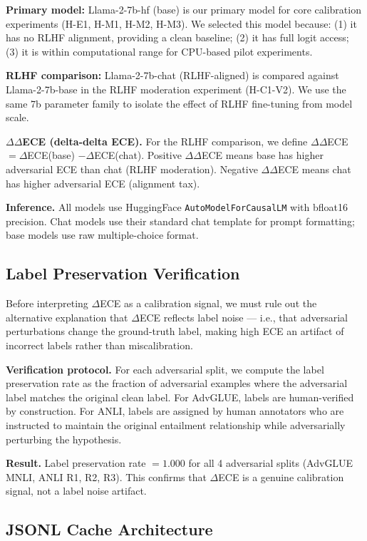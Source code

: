 \textbf{Primary model:} Llama-2-7b-hf (base) is our primary model for core calibration experiments (H-E1, H-M1, H-M2, H-M3). We selected this model because: (1) it has no RLHF alignment, providing a clean baseline; (2) it has full logit access; (3) it is within computational range for CPU-based pilot experiments.

\textbf{RLHF comparison:} Llama-2-7b-chat (RLHF-aligned) is compared against Llama-2-7b-base in the RLHF moderation experiment (H-C1-V2). We use the same 7b parameter family to isolate the effect of RLHF fine-tuning from model scale.

\textbf{$\Delta\Delta$ECE (delta-delta ECE).} For the RLHF comparison, we define $\Delta\Delta$ECE $= \Delta$ECE(base) $- \Delta$ECE(chat). Positive $\Delta\Delta$ECE means base has higher adversarial ECE than chat (RLHF moderation). Negative $\Delta\Delta$ECE means chat has higher adversarial ECE (alignment tax).

\textbf{Inference.} All models use HuggingFace \texttt{AutoModelForCausalLM} with bfloat16 precision. Chat models use their standard chat template for prompt formatting; base models use raw multiple-choice format.

\subsection{Label Preservation Verification}

Before interpreting $\Delta$ECE as a calibration signal, we must rule out the alternative explanation that $\Delta$ECE reflects label noise --- i.e., that adversarial perturbations change the ground-truth label, making high ECE an artifact of incorrect labels rather than miscalibration.

\textbf{Verification protocol.} For each adversarial split, we compute the label preservation rate as the fraction of adversarial examples where the adversarial label matches the original clean label. For AdvGLUE, labels are human-verified by construction. For ANLI, labels are assigned by human annotators who are instructed to maintain the original entailment relationship while adversarially perturbing the hypothesis.

\textbf{Result.} Label preservation rate $= 1.000$ for all 4 adversarial splits (AdvGLUE MNLI, ANLI R1, R2, R3). This confirms that $\Delta$ECE is a genuine calibration signal, not a label noise artifact.

\subsection{JSONL Cache Architecture}

